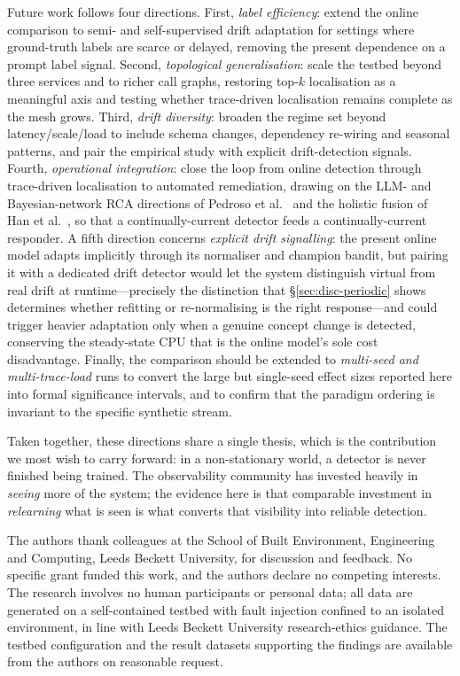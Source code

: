 \documentclass[acmsmall]{acmart}
\begin{document}
Future work follows four directions. First, \emph{label efficiency}: extend the online comparison to semi- and self-supervised drift adaptation for settings where ground-truth labels are scarce or delayed, removing the present dependence on a prompt label signal. Second, \emph{topological generalisation}: scale the testbed beyond three services and to richer call graphs, restoring top-$k$ localisation as a meaningful axis and testing whether trace-driven localisation remains complete as the mesh grows. Third, \emph{drift diversity}: broaden the regime set beyond latency/scale/load to include schema changes, dependency re-wiring and seasonal patterns, and pair the empirical study with explicit drift-detection signals. Fourth, \emph{operational integration}: close the loop from online detection through trace-driven localisation to automated remediation, drawing on the LLM- and Bayesian-network RCA directions of Pedroso et al.\ \cite{pedroso2025} and the holistic fusion of Han et al.\ \cite{han2024}, so that a continually-current detector feeds a continually-current responder. A fifth direction concerns \emph{explicit drift signalling}: the present online model adapts implicitly through its normaliser and champion bandit, but pairing it with a dedicated drift detector would let the system distinguish virtual from real drift at runtime---precisely the distinction that \S\ref{sec:disc-periodic} shows determines whether refitting or re-normalising is the right response---and could trigger heavier adaptation only when a genuine concept change is detected, conserving the steady-state CPU that is the online model's sole cost disadvantage. Finally, the comparison should be extended to \emph{multi-seed and multi-trace-load} runs to convert the large but single-seed effect sizes reported here into formal significance intervals, and to confirm that the paradigm ordering is invariant to the specific synthetic stream.

Taken together, these directions share a single thesis, which is the contribution we most wish to carry forward: in a non-stationary world, a detector is never finished being trained. The observability community has invested heavily in \emph{seeing} more of the system; the evidence here is that comparable investment in \emph{relearning} what is seen is what converts that visibility into reliable detection.


\begin{acks}
The authors thank colleagues at the School of Built Environment, Engineering and Computing, Leeds Beckett University, for discussion and feedback. No specific grant funded this work, and the authors declare no competing interests. The research involves no human participants or personal data; all data are generated on a self-contained testbed with fault injection confined to an isolated environment, in line with Leeds Beckett University research-ethics guidance. The testbed configuration and the result datasets supporting the findings are available from the authors on reasonable request.
\end{acks}
\end{document}
